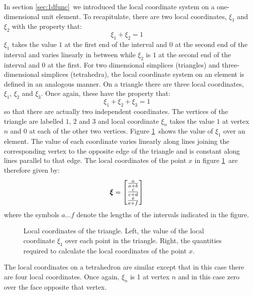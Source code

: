 \documentclass[a4paper, 11pt]{book}
\newcommand{\ifhtlatex}[2]{\ifthenelse{\boolean{HTLatex}}{#1}{#2}}
\newcommand{\xfig}[1]{
  \ifhtlatex{
    \texttt{[image: \#1.png]}
  }{
    
  }
}
\begin{document}
In section \ref{sec:1dfunc}\ we introduced the local coordinate system on a
one-dimensional unit element. To recapitulate, there are two local coordinates,
$\xi_1$ and $\xi_2$ with the property that:
\begin{equation}
  \xi_1+\xi_2=1
\end{equation}
$\xi_1$ takes the value $1$ at the first end of the interval and $0$ at the
second end of the interval and varies linearly in between while $\xi_2$ is
$1$ at the second end of the interval and $0$ at the first. For two
dimensional simplices (triangles) and three-dimensional simplices
(tetrahedra), the local coordinate system on an element is defined in an
analogous manner. On a triangle there are three local coordinates, $\xi_1$,
$\xi_2$ and $\xi_3$. Once again, these have the property that:
\begin{equation}
  \xi_1+\xi_2+\xi_3=1
\end{equation}
so that there are actually two independent coordinates. The vertices of the
triangle are labelled $1$, $2$ and $3$ and local coordinate $\xi_n$ takes
the value $1$ at vertex $n$ and $0$ at each of the other two
vertices. Figure \ref{fig:localtri}\ shows the value of $\xi_1$ over an
element. The value of each coordinate varies linearly along lines joining
the corresponding vertex to the opposite edge of the triangle and is
constant along lines parallel to that edge. The local coordinates of the
point $x$ in figure \ref{fig:localtri}\ are therefore given by:
\begin{equation}
  \pmb{\xi}=
  \begin{bmatrix}
    \frac{a}{a+b}\\
    \frac{c}{c+d}\\
    \frac{e}{e+f}
  \end{bmatrix}
\end{equation}
where the symbols $a\ldots f$ denote the lengths of the intervals indicated
in the figure.
\begin{figure}[t]
  \centering
  \xfig{local_coords_tri}
  \caption{Local coordinates of the triangle. Left, the value of the
    local coordinate $\xi_1$ over each point in the triangle. Right, the
    quantities required to calculate the local coordinates of the point $x$.}
  \label{fig:localtri}
\end{figure}

The local coordinates on a tetrahedron are similar except that in this case
there are four local coordinates. Once again, $\xi_n$ is 1 at vertex $n$ and
in this case zero over the face opposite that vertex. 
\end{document}
